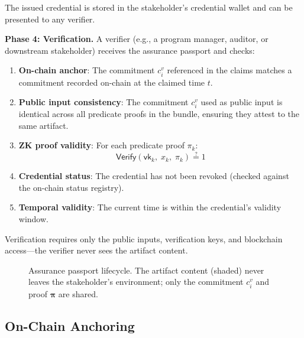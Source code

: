 The issued credential is stored in the stakeholder's credential wallet and can be presented to any verifier.

\textbf{Phase 4: Verification.}
A verifier (e.g., a program manager, auditor, or downstream stakeholder) receives the assurance passport and checks:
\begin{enumerate}
    \item \textbf{On-chain anchor}: The commitment $c_i^{v}$ referenced in the claims matches a commitment recorded on-chain at the claimed time $t$.
    \item \textbf{Public input consistency}: The commitment $c_i^{v}$ used as public input is identical across all predicate proofs in the bundle, ensuring they attest to the same artifact.
    \item \textbf{ZK proof validity}: For each predicate proof $\pi_k$:
    \begin{equation}
    \label{eq:verify}
    \textsf{Verify}(\mathsf{vk}_k,\; x_k,\; \pi_k) \stackrel{?}{=} 1
    \end{equation}
    \item \textbf{Credential status}: The credential has not been revoked (checked against the on-chain status registry).
    \item \textbf{Temporal validity}: The current time is within the credential's validity window.
\end{enumerate}
Verification requires only the public inputs, verification keys, and blockchain access---the verifier never sees the artifact content.

\begin{figure}[t]
\centering
\caption{Assurance passport lifecycle. The artifact content (shaded) never leaves the stakeholder's environment; only the commitment $c_i^{v}$ and proof $\boldsymbol{\pi}$ are shared.}
\label{fig:lifecycle}
\end{figure}

\subsection{On-Chain Anchoring}
\label{sec:fw-anchoring}

